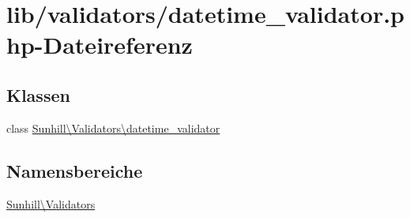 \hypertarget{datetime__validator_8php}{}\section{lib/validators/datetime\+\_\+validator.php-\/\+Dateireferenz}
\label{datetime__validator_8php}
\subsection*{Klassen}
\begin{DoxyCompactItemize}
\item 
class \hyperlink{classSunhill_1_1Validators_1_1datetime__validator}{Sunhill\textbackslash{}\+Validators\textbackslash{}datetime\+\_\+validator}
\end{DoxyCompactItemize}
\subsection*{Namensbereiche}
\begin{DoxyCompactItemize}
\item 
 \hyperlink{namespaceSunhill_1_1Validators}{Sunhill\textbackslash{}\+Validators}
\end{DoxyCompactItemize}
